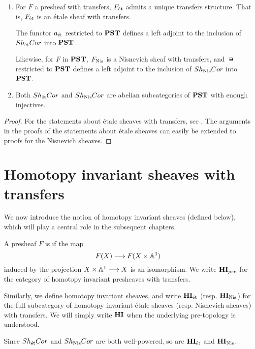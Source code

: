 \begin{prop}\label{prop_et_and_nis_sheafification}
\begin{enumerate}
\item For $F$ a presheaf with transfers, $F_{\mathrm{\acute{e}t}}$ admits a 
unique transfers structure. That is, $F_{\mathrm{\acute{e}t}}$ is an \'etale 
sheaf with transfers.

The functor $a_{\mathrm{\acute{e}t}}$ restricted to $\mathbf{PST}$ defines a left adjoint
to the inclusion of $Sh_{\mathrm{\acute{e}t}}Cor$ into $\mathbf{PST}$. 

Likewise, for $F$ in $\mathbf{PST}$, $F_{\mathrm{Nis}}$ is a Nisnevich sheaf with
transfers, and $\nis$ restricted to $\mathbf{PST}$ defines a left adjoint 
to the inclusion of $Sh_{\mathrm{Nis}}Cor$ into $\mathbf{PST}$. 

\item Both $Sh_{\mathrm{\acute{e}t}}Cor$ and $Sh_{\mathrm{Nis}}Cor$ are abelian 
subcategories of $\mathbf{PST}$ with enough injectives.
\end{enumerate}
\end{prop}
\begin{proof}
For the statements about \'etale sheaves with transfers, see 
\cite[6.17, 6.18 and 6.19]{MVW}. The arguments in the proofs of the
statements about \'etale sheaves can easily be extended to proofs
for the Nisnevich sheaves.
\end{proof}

\section{Homotopy invariant sheaves with transfers}

We now introduce the notion of homotopy invariant sheaves (defined
below), which will play a central role in the subsequent chapters.

\begin{defn}
A presheaf $F$ is  if the map 
\[
F(X) \longrightarrow F(X \times \mathbb{A}^1)
\]
induced by the projection $X \times \mathbb{A}^1 \longrightarrow X$ is an isomorphism.
We write $\mathbf{HI}_{pre}$ for the category of homotopy invariant 
presheaves with transfers.

Similarly, we define homotopy invariant sheaves, and write $\mathbf{HI}_{\mathrm{\acute{e}t}}$ 
(resp. $\mathbf{HI}_{\mathrm{Nis}}$) for the full subcategory of homotopy invariant 
\'etale sheaves (resp. Nisnevich sheaves) with transfers. We will 
simply write $\mathbf{HI}$ when the underlying pre-topology is understood.

Since $Sh_{\mathrm{\acute{e}t}}Cor$ and $Sh_{\mathrm{Nis}}Cor$ are both well-powered, so are 
$\mathbf{HI}_{\mathrm{\acute{e}t}}$ and $\mathbf{HI}_{\mathrm{Nis}}$.
\end{defn}

